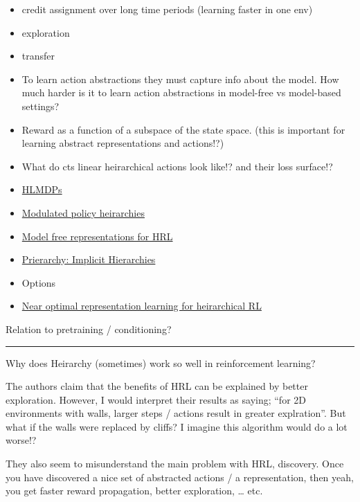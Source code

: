 \begin{itemize}
\item
  credit assignment over long time periods (learning faster in one env)
\item
  exploration
\item
  transfer
\item
  To learn action abstractions they must capture info about the model.
  How much harder is it to learn action abstractions in model-free vs
  model-based settings?
\item
  Reward as a function of a subspace of the state space. (this is
  important for learning abstract representations and actions!?)
\item
  What do cts linear heirarchical actions look like!? and their loss
  surface!?
\item
  \href{https://arxiv.org/abs/1612.02757}{HLMDPs}
\item
  \href{https://arxiv.org/abs/1812.00025}{Modulated policy heirarchies}
\item
  \href{https://arxiv.org/abs/1810.10096}{Model free representations for
  HRL}
\item
  \href{https://blog.aqnichol.com/2019/04/03/prierarchy-implicit-hierarchies/}{Prierarchy:
  Implicit Hierarchies}
\item
  Options
\item
  \href{https://openreview.net/forum?id=H1emus0qF7}{Near optimal
  representation learning for heirarchical RL}
\end{itemize}

Relation to pretraining / conditioning?

\begin{center}\rule{0.5\linewidth}{\linethickness}\end{center}

Why does Heirarchy (sometimes) work so well in reinforcement learning?

The authors claim that the benefits of HRL can be explained by better
exploration. However, I would interpret their results as saying; ``for
2D environments with walls, larger steps / actions result in greater
explration''. But what if the walls were replaced by cliffs? I imagine
this algorithm would do a lot worse!?

They also seem to misunderstand the main problem with HRL, discovery.
Once you have discovered a nice set of abstracted actions / a
representation, then yeah, you get faster reward propagation, better
exploration, \ldots{} etc.

